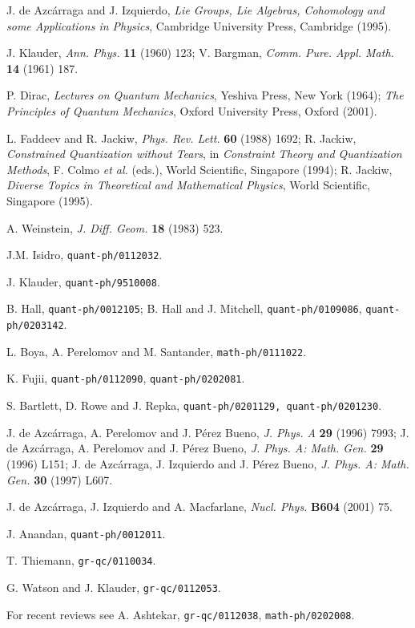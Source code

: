 \documentclass[a4paper,a4paper]{article}
\begin{document}
\begin{thebibliography}{99}
J. de Azc\'arraga and J. Izquierdo, {\it Lie Groups, Lie Algebras, 
Cohomology and some Applications in Physics}, Cambridge University Press, 
Cambridge (1995).

J. Klauder, {\it Ann. Phys.} {\bf 11} (1960) 123;
V. Bargman, {\it Comm. Pure. Appl. Math.} {\bf 14} (1961) 187.

P. Dirac, {\it Lectures on Quantum Mechanics}, Yeshiva Press, New York (1964);
{\it The Principles of Quantum Mechanics}, Oxford University Press, Oxford (2001).

L. Faddeev and R. Jackiw, {\it Phys. Rev. Lett.} {\bf 60} (1988) 1692;
R. Jackiw, {\it Constrained Quantization without Tears}, in {\it Constraint 
Theory and Quantization Methods}, F. Colmo {\it et al.} (eds.), World 
Scientific, Singapore (1994); R. Jackiw, {\it Diverse Topics in 
Theoretical and Mathematical Physics}, World Scientific, Singapore (1995).

A. Weinstein, {\it J. Diff. Geom.} {\bf 18} (1983) 523.

J.M. Isidro, {\tt quant-ph/0112032}.

J. Klauder, {\tt quant-ph/9510008}.

B. Hall, {\tt quant-ph/0012105};
B. Hall and J. Mitchell, {\tt quant-ph/0109086}, {\tt quant-ph/0203142}.

L. Boya, A. Perelomov and M. Santander, {\tt math-ph/0111022}.

K. Fujii, {\tt quant-ph/0112090}, {\tt quant-ph/0202081}.

S. Bartlett, D. Rowe and J. Repka, {\tt quant-ph/0201129, 
quant-ph/0201230}.

J. de Azc\'arraga, A. Perelomov and J. P\'erez Bueno, {\it J. Phys. A} 
{\bf 29} (1996) 7993;
J. de Azc\'arraga, A. Perelomov and J. P\'erez Bueno, {\it J. Phys. A: 
Math. Gen.} {\bf 29} (1996) L151;
J. de Azc\'arraga, J. Izquierdo and J. P\'erez Bueno, {\it J. Phys. A: 
Math. Gen.} {\bf 30} (1997) L607.

J. de Azc\'arraga, J. Izquierdo and A. Macfarlane, {\it Nucl. Phys.} 
{\bf B604} (2001) 75.

J. Anandan, {\tt quant-ph/0012011}.

T. Thiemann, {\tt gr-qc/0110034}.

G. Watson and J. Klauder, {\tt gr-qc/0112053}.

For recent reviews see A. Ashtekar, {\tt gr-qc/0112038}, {\tt math-ph/0202008}.

\end{thebibliography}
\end{document}
